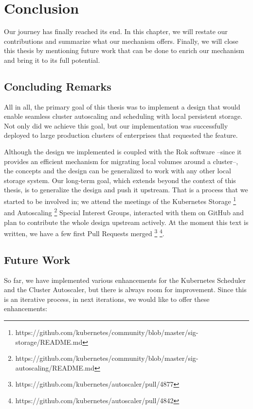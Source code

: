\chapter{Conclusion} \label{chapter:conclusion}

Our journey has finally reached its end. In this chapter, we will restate our
contributions and summarize what our mechanism offers. Finally, we will close
this thesis by mentioning future work that can be done to enrich our mechanism
and bring it to its full potential.

\section{Concluding Remarks} \label{section:conclusion_concluding_remarks}

All in all, the primary goal of this thesis was to implement a design that would
enable seamless cluster autoscaling and scheduling with local persistent
storage. Not only did we achieve this goal, but our implementation was
successfully deployed to large production clusters of enterprises that requested
the feature.

Although the design we implemented is coupled with the Rok software --since it
provides an efficient mechanism for migrating local volumes around a cluster--,
the concepts and the design can be generalized to work with any other local
storage system. Our long-term goal, which extends beyond the context of this
thesis, is to generalize the design and push it upstream. That is a process that
we started to be involved in; we attend the meetings of the Kubernetes Storage
\footnote{https://github.com/kubernetes/community/blob/master/sig-storage/README.md}
and Autoscaling
\footnote{https://github.com/kubernetes/community/blob/master/sig-autoscaling/README.md}
Special Interest Groups, interacted with them on GitHub and plan to contribute
the whole design upstream actively. At the moment this text is written, we have
a few first Pull Requests merged
\footnote{https://github.com/kubernetes/autoscaler/pull/4877}
\footnote{https://github.com/kubernetes/autoscaler/pull/4842}.

\section{Future Work} \label{section:conclusion_future_work}

So far, we have implemented various enhancements for the Kubernetes Scheduler
and the Cluster Autoscaler, but there is always room for improvement. Since this
is an iterative process, in next iterations, we would like to offer these
enhancements:

